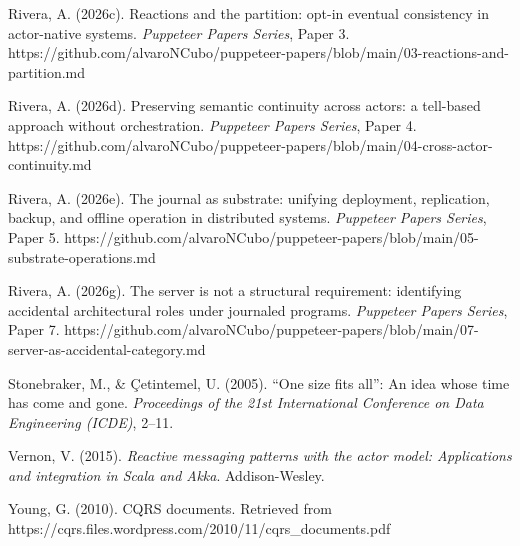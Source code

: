 \documentclass[
]{article}
\begin{document}
Rivera, A. (2026c). Reactions and the partition: opt-in eventual
consistency in actor-native systems. \emph{Puppeteer Papers Series},
Paper 3.
https://github.com/alvaroNCubo/puppeteer-papers/blob/main/03-reactions-and-partition.md

Rivera, A. (2026d). Preserving semantic continuity across actors: a
tell-based approach without orchestration. \emph{Puppeteer Papers
Series}, Paper 4.
https://github.com/alvaroNCubo/puppeteer-papers/blob/main/04-cross-actor-continuity.md

Rivera, A. (2026e). The journal as substrate: unifying deployment,
replication, backup, and offline operation in distributed systems.
\emph{Puppeteer Papers Series}, Paper 5.
https://github.com/alvaroNCubo/puppeteer-papers/blob/main/05-substrate-operations.md

Rivera, A. (2026g). The server is not a structural requirement:
identifying accidental architectural roles under journaled programs.
\emph{Puppeteer Papers Series}, Paper 7.
https://github.com/alvaroNCubo/puppeteer-papers/blob/main/07-server-as-accidental-category.md

Stonebraker, M., \& Çetintemel, U. (2005). ``One size fits all'': An
idea whose time has come and gone. \emph{Proceedings of the 21st
International Conference on Data Engineering (ICDE)}, 2--11.

Vernon, V. (2015). \emph{Reactive messaging patterns with the actor
model: Applications and integration in Scala and Akka}. Addison-Wesley.

Young, G. (2010). CQRS documents. Retrieved from
https://cqrs.files.wordpress.com/2010/11/cqrs\_documents.pdf
\end{document}
